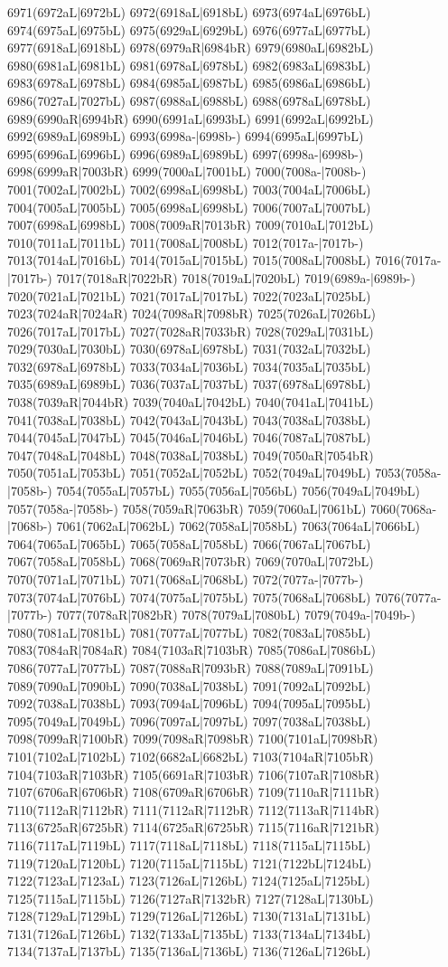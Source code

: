 6971(6972aL|6972bL) 6972(6918aL|6918bL) 6973(6974aL|6976bL) 6974(6975aL|6975bL) 6975(6929aL|6929bL) 6976(6977aL|6977bL) 6977(6918aL|6918bL) 6978(6979aR|6984bR) 6979(6980aL|6982bL) 6980(6981aL|6981bL) 6981(6978aL|6978bL) 6982(6983aL|6983bL) 6983(6978aL|6978bL) 6984(6985aL|6987bL) 6985(6986aL|6986bL) 6986(7027aL|7027bL) 6987(6988aL|6988bL) 6988(6978aL|6978bL) 6989(6990aR|6994bR) 6990(6991aL|6993bL) 6991(6992aL|6992bL) 6992(6989aL|6989bL) 6993(6998a-|6998b-) 6994(6995aL|6997bL) 6995(6996aL|6996bL) 6996(6989aL|6989bL) 6997(6998a-|6998b-) 6998(6999aR|7003bR) 6999(7000aL|7001bL) 7000(7008a-|7008b-) 7001(7002aL|7002bL) 7002(6998aL|6998bL) 7003(7004aL|7006bL) 7004(7005aL|7005bL) 7005(6998aL|6998bL) 7006(7007aL|7007bL) 7007(6998aL|6998bL) 7008(7009aR|7013bR) 7009(7010aL|7012bL) 7010(7011aL|7011bL) 7011(7008aL|7008bL) 7012(7017a-|7017b-) 7013(7014aL|7016bL) 7014(7015aL|7015bL) 7015(7008aL|7008bL) 7016(7017a-|7017b-) 7017(7018aR|7022bR) 7018(7019aL|7020bL) 7019(6989a-|6989b-) 7020(7021aL|7021bL) 7021(7017aL|7017bL) 7022(7023aL|7025bL) 7023(7024aR|7024aR) 7024(7098aR|7098bR) 7025(7026aL|7026bL) 7026(7017aL|7017bL) 7027(7028aR|7033bR) 7028(7029aL|7031bL) 7029(7030aL|7030bL) 7030(6978aL|6978bL) 7031(7032aL|7032bL) 7032(6978aL|6978bL) 7033(7034aL|7036bL) 7034(7035aL|7035bL) 7035(6989aL|6989bL) 7036(7037aL|7037bL) 7037(6978aL|6978bL) 7038(7039aR|7044bR) 7039(7040aL|7042bL) 7040(7041aL|7041bL) 7041(7038aL|7038bL) 7042(7043aL|7043bL) 7043(7038aL|7038bL) 7044(7045aL|7047bL) 7045(7046aL|7046bL) 7046(7087aL|7087bL) 7047(7048aL|7048bL) 7048(7038aL|7038bL) 7049(7050aR|7054bR) 7050(7051aL|7053bL) 7051(7052aL|7052bL) 7052(7049aL|7049bL) 7053(7058a-|7058b-) 7054(7055aL|7057bL) 7055(7056aL|7056bL) 7056(7049aL|7049bL) 7057(7058a-|7058b-) 7058(7059aR|7063bR) 7059(7060aL|7061bL) 7060(7068a-|7068b-) 7061(7062aL|7062bL) 7062(7058aL|7058bL) 7063(7064aL|7066bL) 7064(7065aL|7065bL) 7065(7058aL|7058bL) 7066(7067aL|7067bL) 7067(7058aL|7058bL) 7068(7069aR|7073bR) 7069(7070aL|7072bL) 7070(7071aL|7071bL) 7071(7068aL|7068bL) 7072(7077a-|7077b-) 7073(7074aL|7076bL) 7074(7075aL|7075bL) 7075(7068aL|7068bL) 7076(7077a-|7077b-) 7077(7078aR|7082bR) 7078(7079aL|7080bL) 7079(7049a-|7049b-) 7080(7081aL|7081bL) 7081(7077aL|7077bL) 7082(7083aL|7085bL) 7083(7084aR|7084aR) 7084(7103aR|7103bR) 7085(7086aL|7086bL) 7086(7077aL|7077bL) 7087(7088aR|7093bR) 7088(7089aL|7091bL) 7089(7090aL|7090bL) 7090(7038aL|7038bL) 7091(7092aL|7092bL) 7092(7038aL|7038bL) 7093(7094aL|7096bL) 7094(7095aL|7095bL) 7095(7049aL|7049bL) 7096(7097aL|7097bL) 7097(7038aL|7038bL) 7098(7099aR|7100bR) 7099(7098aR|7098bR) 7100(7101aL|7098bR) 7101(7102aL|7102bL) 7102(6682aL|6682bL) 7103(7104aR|7105bR) 7104(7103aR|7103bR) 7105(6691aR|7103bR) 7106(7107aR|7108bR) 7107(6706aR|6706bR) 7108(6709aR|6706bR) 7109(7110aR|7111bR) 7110(7112aR|7112bR) 7111(7112aR|7112bR) 7112(7113aR|7114bR) 7113(6725aR|6725bR) 7114(6725aR|6725bR) 7115(7116aR|7121bR) 7116(7117aL|7119bL) 7117(7118aL|7118bL) 7118(7115aL|7115bL) 7119(7120aL|7120bL) 7120(7115aL|7115bL) 7121(7122bL|7124bL) 7122(7123aL|7123aL) 7123(7126aL|7126bL) 7124(7125aL|7125bL) 7125(7115aL|7115bL) 7126(7127aR|7132bR) 7127(7128aL|7130bL) 7128(7129aL|7129bL) 7129(7126aL|7126bL) 7130(7131aL|7131bL) 7131(7126aL|7126bL) 7132(7133aL|7135bL) 7133(7134aL|7134bL) 7134(7137aL|7137bL) 7135(7136aL|7136bL) 7136(7126aL|7126bL) 
